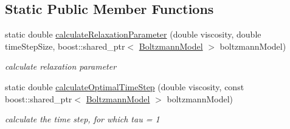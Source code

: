 \subsection*{Static Public Member Functions}
\begin{DoxyCompactItemize}
\item 
\hypertarget{classnatrium_1_1CollisionModel_af8641f834d40077437a57c637c9572b1}{static double \hyperlink{classnatrium_1_1CollisionModel_af8641f834d40077437a57c637c9572b1}{calculate\-Relaxation\-Parameter} (double viscosity, double time\-Step\-Size, boost\-::shared\-\_\-ptr$<$ \hyperlink{classnatrium_1_1BoltzmannModel}{Boltzmann\-Model} $>$ boltzmann\-Model)}\label{classnatrium_1_1CollisionModel_af8641f834d40077437a57c637c9572b1}

\begin{DoxyCompactList}\small\item\em calculate relaxation parameter \end{DoxyCompactList}\item 
\hypertarget{classnatrium_1_1CollisionModel_a7b383765606800e9963688150c3a3297}{static double \hyperlink{classnatrium_1_1CollisionModel_a7b383765606800e9963688150c3a3297}{calculate\-Optimal\-Time\-Step} (double viscosity, const boost\-::shared\-\_\-ptr$<$ \hyperlink{classnatrium_1_1BoltzmannModel}{Boltzmann\-Model} $>$ boltzmann\-Model)}\label{classnatrium_1_1CollisionModel_a7b383765606800e9963688150c3a3297}

\begin{DoxyCompactList}\small\item\em calculate the time step, for which tau = 1 \end{DoxyCompactList}\end{DoxyCompactItemize}
